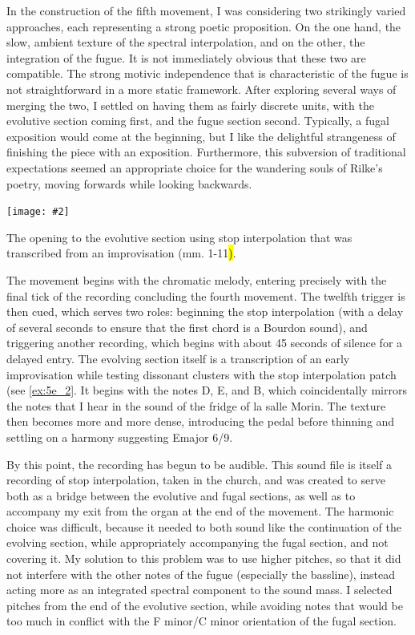 \documentclass[12pt,twoside,maitrise]{dms_ks}
\newcommand{\customincludeexamples}[4][]{%
    \begin{example}[H]
        \centering
        \texttt{[image: \#2]}
        \caption{#4}
	\label{#3} 
    \end{example}
}
\theoremstyle{definition}
\begin{document}
{In the construction of the fifth movement, I was considering two strikingly varied approaches, each representing a strong poetic proposition. 
On the one hand, the slow, ambient texture of the spectral interpolation, and on the other, the integration of the fugue. 
It is not immediately obvious that these two are compatible.
The strong motivic independence that is characteristic of the fugue is not straightforward in a more static framework.
After exploring several ways of merging the two, I settled on having them as fairly discrete units, with the evolutive section coming first, and the fugue section second. 
Typically, a fugal exposition would come at the beginning, but I like the delightful strangeness of finishing the piece with an exposition. 
Furthermore, this subversion of traditional expectations seemed an appropriate choice for the wandering souls of Rilke's poetry, moving forwards while looking backwards. 

\customincludeexamples[width=\textwidth]{5e_2}{ex:5e_2}{The opening to the evolutive section using stop interpolation that was transcribed from an improvisation (mm. 1-11\hl{)}.}

The movement begins with the chromatic melody, entering precisely with the final tick of the recording concluding the fourth movement. The twelfth trigger is then cued, which serves two roles: beginning the stop interpolation (with a delay of several seconds to ensure that the first chord is a Bourdon sound), and triggering another recording, which begins with about 45 seconds of silence for a delayed entry. 
The evolving section itself is a transcription of an early improvisation while testing dissonant clusters with the stop interpolation patch (see \cref{ex:5e_2}.
It begins with the notes D, E\fl, and B\fl, which coincidentally mirrors the notes that I hear in the sound of the fridge of la salle Morin.
The texture then becomes more and more dense, introducing the pedal before thinning and settling on a harmony suggesting E\fl major 6/9. 

By this point, the recording has begun to be audible. 
This sound file is itself a recording of stop interpolation, taken in the church, and was created to serve both as a bridge between the evolutive and fugal sections, as well as to accompany my exit from the organ at the end of the movement. 
The harmonic choice was difficult, because it needed to both sound like the continuation of the evolving section, while appropriately accompanying the fugal section, and not covering it. 
My solution to this problem was to use higher pitches, so that it did not interfere with the other notes of the fugue (especially the bassline), instead acting more as an integrated spectral component to the sound mass. 
I selected pitches from the end of the evolutive section, while avoiding notes that would be too much in conflict with the F minor/C minor orientation of the fugal section.

}
\end{document}
